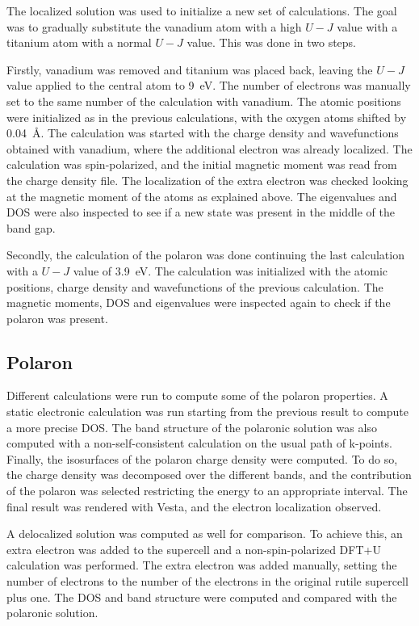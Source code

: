 The localized solution was used to initialize a new set of calculations. The goal was to gradually substitute the vanadium atom with a high $U-J$ value with a titanium atom with a normal $U-J$ value. This was done in two steps.

Firstly, vanadium was removed and titanium was placed back, leaving the $U-J$ value applied to the central atom to \SI{9}{eV}. The number of electrons was manually set to the same number of the calculation with vanadium. The atomic positions were initialized as in the previous calculations, with the oxygen atoms shifted by \SI{0.04}{\angstrom}. The calculation was started with the charge density and wavefunctions obtained with vanadium, where the additional electron was already localized.
The calculation was spin-polarized, and the initial magnetic moment was read from the charge density file. The localization of the extra electron was checked looking at the magnetic moment of the atoms as explained above. The eigenvalues and DOS were also inspected to see if a new state was present in the middle of the band gap.

Secondly, the calculation of the polaron was done continuing the last calculation with a $U-J$ value of \SI{3.9}{eV}. The calculation was initialized with the atomic positions, charge density and wavefunctions of the previous calculation. The magnetic moments, DOS and eigenvalues were inspected again to check if the polaron was present.

\subsection{Polaron}
Different calculations were run to compute some of the polaron properties. A static electronic calculation was run starting from the previous result to compute a more precise DOS. The band structure of the polaronic solution was also computed with a non-self-consistent calculation on the usual path of k-points. Finally, the isosurfaces of the polaron charge density were computed. To do so, the charge density was decomposed over the different bands, and the contribution of the polaron was selected restricting the energy to an appropriate interval. The final result was rendered with Vesta, and the electron localization observed.

A delocalized solution was computed as well for comparison. To achieve this, an extra electron was added to the supercell and a non-spin-polarized DFT+U calculation was performed. The extra electron was added manually, setting the number of electrons to the number of the electrons in the original rutile supercell plus one. The DOS and band structure were computed and compared with the polaronic solution.